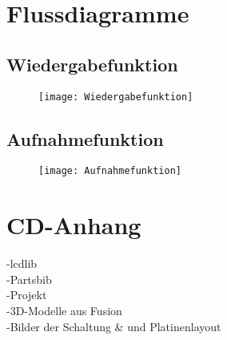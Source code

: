 
\newpage
\appendix
\section{Flussdiagramme}
\subsection{Wiedergabefunktion}
\label{fluss:playf}
\begin{figure}[h]
	\begin{center}
			\texttt{[image: Wiedergabefunktion]}
	\end{center}
\end{figure}
\newpage
\subsection{Aufnahmefunktion}
\label{fluss:recf}
\begin{figure}[h]
	\begin{center}
		\texttt{[image: Aufnahmefunktion]}
	\end{center}
\end{figure}
\newpage
\section{CD-Anhang}
-lcdlib\\
-Partsbib\\
-Projekt\\
-3D-Modelle aus Fusion\\
-Bilder der Schaltung \& und Platinenlayout\\